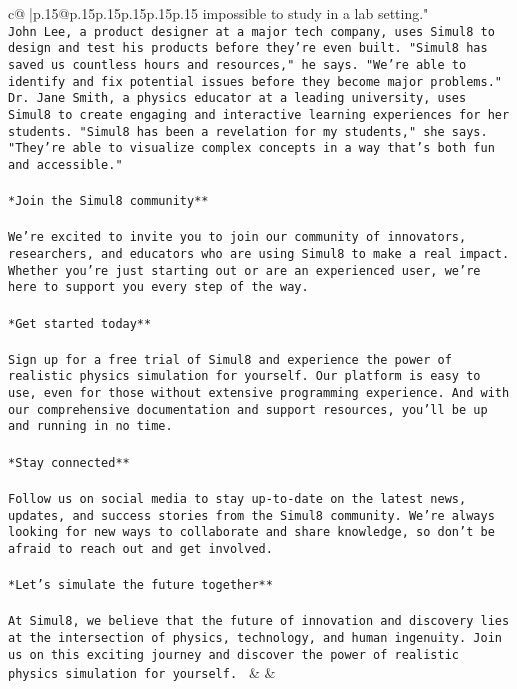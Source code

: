 \documentclass{article}
\begin{document}
{\begin{supertabular}{c@{$\;$}|p{.15\linewidth}@{}p{.15\linewidth}p{.15\linewidth}p{.15\linewidth}p{.15\linewidth}p{.15\linewidth}}
{{{impossible to study in a lab setting."\\ \tt * John Lee, a product designer at a major tech company, uses Simul8 to design and test his products before they're even built. "Simul8 has saved us countless hours and resources," he says. "We're able to identify and fix potential issues before they become major problems."\\ \tt * Dr. Jane Smith, a physics educator at a leading university, uses Simul8 to create engaging and interactive learning experiences for her students. "Simul8 has been a revelation for my students," she says. "They're able to visualize complex concepts in a way that's both fun and accessible."\\ \tt \\ \tt **Join the Simul8 community**\\ \tt \\ \tt We're excited to invite you to join our community of innovators, researchers, and educators who are using Simul8 to make a real impact. Whether you're just starting out or are an experienced user, we're here to support you every step of the way.\\ \tt \\ \tt **Get started today**\\ \tt \\ \tt Sign up for a free trial of Simul8 and experience the power of realistic physics simulation for yourself. Our platform is easy to use, even for those without extensive programming experience. And with our comprehensive documentation and support resources, you'll be up and running in no time.\\ \tt \\ \tt **Stay connected**\\ \tt \\ \tt Follow us on social media to stay up-to-date on the latest news, updates, and success stories from the Simul8 community. We're always looking for new ways to collaborate and share knowledge, so don't be afraid to reach out and get involved.\\ \tt \\ \tt **Let's simulate the future together**\\ \tt \\ \tt At Simul8, we believe that the future of innovation and discovery lies at the intersection of physics, technology, and human ingenuity. Join us on this exciting journey and discover the power of realistic physics simulation for yourself. 
	  } 
	   } 
	   } 
	 & & \\ 
 


\end{supertabular}}
\end{document}
